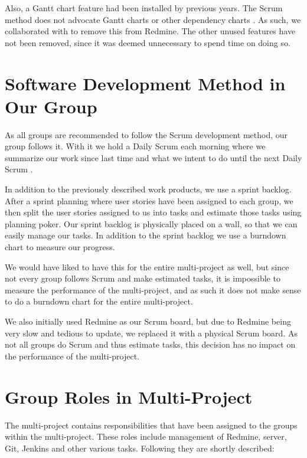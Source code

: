 Also, a Gantt chart feature had been installed by previous years. The Scrum method does not advocate Gantt charts or other dependency charts \parencite{larman2003}. As such, we collaborated with  to remove this from Redmine. The other unused features have not been removed, since it was deemed unnecessary to spend time on doing so.

\section{Software Development Method in Our Group}\label{sec:swmethod_ourgroup}
As all groups are recommended to follow the Scrum development method, our group follows it. With it we hold a Daily Scrum each morning where we summarize our work since last time and what we intent to do until the next Daily Scrum .

In addition to the previously described work products, we use a sprint backlog. After a sprint planning where user stories have been assigned to each group, we then split the user stories assigned to us into tasks and estimate those tasks using planning poker. Our sprint backlog is physically placed on a wall, so that we can easily manage our tasks. In addition to the sprint backlog we use a burndown chart to measure our progress.

We would have liked to have this for the entire multi-project as well, but since not every group follows Scrum and make estimated tasks, it is impossible to measure the performance of the multi-project, and as such it does not make sense to do a burndown chart for the entire multi-project. 

We also initially used Redmine as our Scrum board, but due to Redmine being very slow and tedious to update, we replaced it with a physical Scrum board. As not all groups do Scrum and thus estimate tasks, this decision has no impact on the performance of the multi-project. 

\section{Group Roles in Multi-Project}\label{sec:multi_project_group_roles}
The multi-project contains responsibilities that have been assigned to the groups within the multi-project. These roles include management of Redmine, server, Git, Jenkins and other various tasks. Following they are shortly described:

